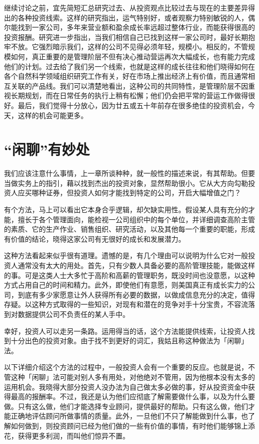 \documentclass[UTF8,a4paper,zihao=-4,fontset = windows]{ctexart} %
\begin{document}
继续讨论之前，宜先简短汇总研究过去、从投资观点比较过去与现在的主要差异得出的各种投资线索。这样的研究指出，运气特别好，或者观察力特别敏锐的人，偶尔能找到一家公司，多年来营业额和盈余成长率远超过整体行业，而能获得很高的投资报酬。研究进一步指出，当我们相信自己已找到这样一家公司时，最好长期抱牢不放。它强烈暗示我们，这样的公司不见得必须年轻，规模小。相反的，不管规模如何，真正重要的是管理阶层不但有决心推动营运再次大幅成长，也有能力完成他们的计划。过去给了我们另一个线索，也就是这样的成长往往和他们晓得如何在各个自然科学领域组织研究工作有关，好在市场上推出经济上有价值，而且通常相互关联的产品线。我们可以清楚地看出，这种公司的共同特性，是管理阶层不因重视长期规划，而在日常任务的执行上稍有松懈；他们仍会把平常的营运工作做得很好。最后，我们觉得十分放心，因为廿五或五十年前存在很多绝佳的投资机会，今天，这样的机会可能更多。

\section{“闲聊”有妙处}

我们应该注意什么事情，上一章所谈种种，就一般性的描述来说，有其帮助。但要当做实务上的指引，藉以找到杰出的投资对象，显然帮助很小。它从大方向勾勒投资人应买哪种证券，但投资人如何才能找到特定的公司，开启大幅增值之门？

有个方法，马上可以看出它本身合乎逻辑，却欠缺实用性。假设某人具有充分的才能，擅长于各个管理面向，能检视一公司组织中的每个单位，并详细调查高阶主管的素质、它的生产作业、销售组织、研究活动，以及其他每一个重要的职能，形成有价值的结论，晓得这家公司有无很好的成长和发展潜力。

这种方法看起来似乎很有道理。遗憾的是，有几个理由可以说明为什么它对一般投资人通常没有太大的用处。首先，只有少数人具备必要的高阶管理技能，能做这样的事。可是这类人士大多忙于高阶和高薪的管理职务，既没时间也没意愿，以这种方式占用自己的时间和精力。此外，即使他们有意愿，则美国真正有成长实力的公司，到底有多少家愿意让外人获得所有必要的数据，以做成信息充分的决定，值得存疑。以这种方式取得的一些知识，对现有和潜在的竞争对手十分宝贵，不容流落到对数据提供公司不负责任的某人手中。

幸好，投资人可以走另一条路。运用得当的话，这个方法能提供线索，让投资人找到十分出色的投资对象。由于找不到更好的词汇，我姑且称这种做法为「闲聊」法。

以下详细介绍这个方法的过程中，一般投资人会有一个重要的反应。也就是说，不管这种「闲聊」法可能对别人多有用处，对他绝对不管用，因为他根本没有太多的运用机会。我晓得大部分投资人没办法为自己做太多必做的事，好从投资资金中获得最高的报酬率。不过，我还是认为他们应彻底了解需要做什么事，以及为什么要做。只有这么做，他们才能选择专业顾问，提供最好的帮助。只有这么做，他们才能正确地评估顾问所做事情的质量。此外，一旦他们不只了解能做到什么事，也了解如何做到，则投资顾问已经为他们做的一些有价值的事情，有时他们能够锦上添花，获得更多利润，而叫他们惊异不置。
\end{document}

